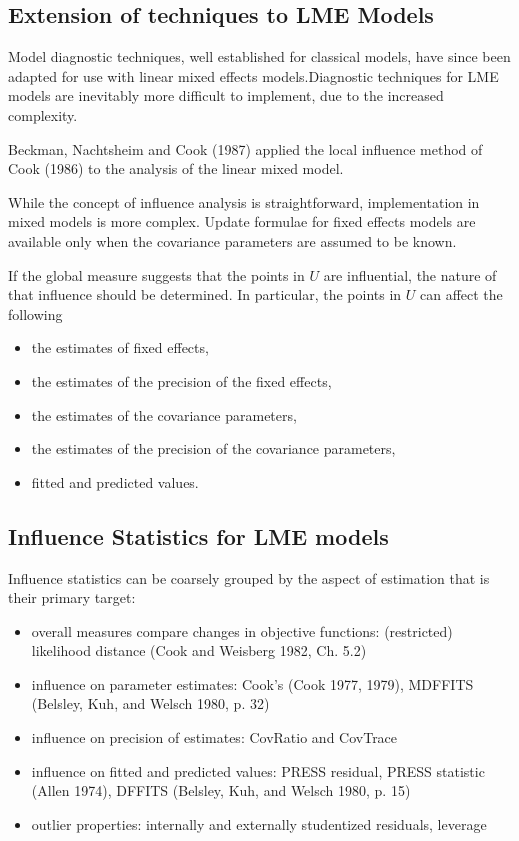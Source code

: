 \documentclass[12pt, a4paper]{article}
\begin{document}
			
			
			
			\subsection{Extension of techniques to LME Models} %
			
			Model diagnostic techniques, well established for classical models, have since been adapted for use with linear mixed effects models.Diagnostic techniques for LME models are inevitably more difficult to implement, due to the increased complexity.
			
			Beckman, Nachtsheim and Cook (1987) \citet{Beckman} applied the local influence method of Cook (1986) to the analysis of the linear mixed model.
			
			While the concept of influence analysis is straightforward, implementation in mixed models is more complex. Update formulae for fixed effects models are available only when the covariance parameters are assumed to be known.
			
			If the global measure suggests that the points in $U$ are influential, the nature of that influence should be determined. In particular, the points in $U$ can affect the following
			
			\begin{itemize}
				\item the estimates of fixed effects,
				\item the estimates of the precision of the fixed effects,
				\item the estimates of the covariance parameters,
				\item the estimates of the precision of the covariance parameters,
				\item fitted and predicted values.
			\end{itemize}
			
			
			
			
			\subsection{Influence Statistics for LME models} %
			Influence statistics can be coarsely grouped by the aspect of estimation that is their primary target:
			\begin{itemize}
				\item overall measures compare changes in objective functions: (restricted) likelihood distance (Cook and Weisberg 1982, Ch. 5.2)
				\item influence on parameter estimates: Cook's  (Cook 1977, 1979), MDFFITS (Belsley, Kuh, and Welsch 1980, p. 32)
				\item influence on precision of estimates: CovRatio and CovTrace
				\item influence on fitted and predicted values: PRESS residual, PRESS statistic (Allen 1974), DFFITS (Belsley, Kuh, and Welsch 1980, p. 15)
				\item outlier properties: internally and externally studentized residuals, leverage
			\end{itemize}
			
\end{document}
